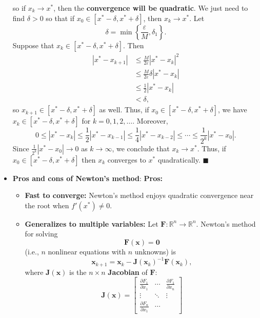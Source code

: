 \documentclass{report}
\begin{document}
\begin{itemize}
    so if $x_k \to x^*$, then the \textbf{convergence will be quadratic}.
    \bigbreak \noindent 
    We just need to find $\delta > 0$ so that if $x_0 \in [x^* - \delta, x^* + \delta]$, then $x_k \to x^*$.
    Let
    $$\delta = \min\left\{\frac{\varepsilon}{M}, \delta_1\right\}.$$
    Suppose that $x_k \in [x^* - \delta, x^* + \delta]$. Then
    \begin{align*}
        \left|x^* - x_{k+1}\right| 
&\leq \frac{M}{2\varepsilon} \left|x^* - x_k\right|^2 \\
&\leq \frac{M}{2\varepsilon} \delta \left|x^* - x_k\right| \\
&\leq \frac{1}{2} \left|x^* - x_k\right| \\
&< \delta,
    \end{align*}
    so $x_{k+1} \in [x^* - \delta, x^* + \delta]$ as well. Thus, if $x_0 \in [x^* - \delta, x^* + \delta]$, we have $x_k \in [x^* - \delta, x^* + \delta]$ for $k = 0, 1, 2, \ldots$.
    \bigbreak \noindent 
    Moreover,
    $$0 \leq \left|x^* - x_k\right| \leq \frac12 \left|x^* - x_{k-1}\right| \leq \frac14 \left|x^* - x_{k-2}\right| \leq \cdots \leq \frac{1}{2^k} \left|x^* - x_{0}\right|.$$
    Since $\frac{1}{2^k} \left|x^* - x_{0}\right| \to 0$ as $k \to \infty$, we conclude that $x_k \to x^*$. Thus, if $x_0 \in [x^* - \delta, x^* + \delta]$ then $x_k$ converges to $x^*$ quadratically. $\blacksquare$
\item \textbf{Pros and cons of Newton's method}:
    \bigbreak \noindent 
    \textbf{Pros:}
    \begin{itemize}
        \item \textbf{Fast to converge:} Newton's method enjoys quadratic convergence near the root when $f'(x^*) \neq 0$.
        \item \textbf{Generalizes to multiple variables:} Let $\mathbf{F} \colon \mathbb{R}^n \to \mathbb{R}^n$. Newton's method for solving 
        $$\mathbf{F}(\mathbf{x}) = \mathbf{0}$$ 
        (i.e., $n$ nonlinear equations with $n$ unknowns) is
        $$ \mathbf{x}_{k+1} = \mathbf{x}_k - \mathbf{J}(\mathbf{x}_k)^{-1} \mathbf{F}(\mathbf{x}_k),$$
        where $\mathbf{J}(\mathbf{x})$ is the $n \times n$ \textbf{Jacobian} of $\mathbf{F}$:
        $$
        \mathbf{J}(\mathbf{x}) = 
        \begin{bmatrix}
            \frac{\partial F_1}{\partial x_1}& \cdots &
            \frac{\partial F_1}{\partial x_n}\\
            \vdots & \ddots & \vdots \\
            \frac{\partial F_n}{\partial x_1}& \cdots &

\end{bmatrix}$$
\end{itemize}
\end{itemize}
\end{document}
